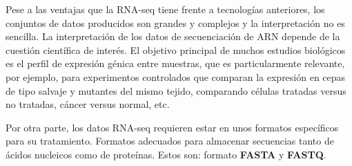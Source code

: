 
Pese a las ventajas que la RNA-seq tiene frente a tecnologías anteriores, los conjuntos de datos producidos son grandes y complejos y la interpretación
no es sencilla. La interpretación de los datos de secuenciación de ARN depende de la cuestión científica de interés. El objetivo principal de muchos 
estudios biológicos es el perfil de expresión génica entre muestras, que es particularmente relevante, por ejemplo, para experimentos controlados 
que comparan la expresión en cepas de tipo salvaje y mutantes del mismo tejido, comparando células tratadas versus no tratadas, cáncer versus normal, etc.

Por otra parte, los datos RNA-seq requieren estar en unos formatos específicos para su tratamiento. Formatos adecuados para almacenar secuencias tanto
de ácidos nucleicos como de proteínas. Estos son: formato \textbf{FASTA} y \textbf{FASTQ}.

